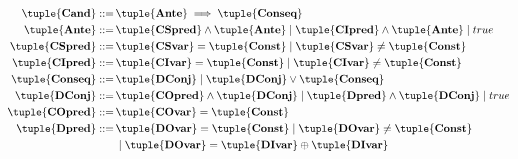 \begin{align}
\tuple{\textbf{Cand}} ::=\, & \tuple{\textbf{Ante}} \implies \tuple{\textbf{Conseq}} \\
\tuple{\textbf{Ante}} ::=\, & \tuple{\textbf{CSpred}} \land \tuple{\textbf{Ante}} \mid \tuple{\textbf{CIpred}} \land \tuple{\textbf{Ante}} \mid true\\
\tuple{\textbf{CSpred}} ::=\, & \tuple{\textbf{CSvar}} = \tuple{\textbf{Const}} \mid \tuple{\textbf{CSvar}} \neq \tuple{\textbf{Const}} \\
\tuple{\textbf{CIpred}} ::=\, & \tuple{\textbf{CIvar}} = \tuple{\textbf{Const}} \mid \tuple{\textbf{CIvar}} \neq \tuple{\textbf{Const}} \\
\tuple{\textbf{Conseq}} ::=\, & \tuple{\textbf{DConj}} \mid \tuple{\textbf{DConj}} \lor \tuple{\textbf{Conseq}} \\
\tuple{\textbf{DConj}} ::=\, & \tuple{\textbf{COpred}} \land \tuple{\textbf{DConj}} \mid \tuple{\textbf{Dpred}} \land \tuple{\textbf{DConj}} \mid true\\
\tuple{\textbf{COpred}} ::=\, & \tuple{\textbf{COvar}} = \tuple{\textbf{Const}} \\
\tuple{\textbf{Dpred}} ::=\, & \tuple{\textbf{DOvar}} = \tuple{\textbf{Const}} \mid \tuple{\textbf{DOvar}} \neq \tuple{\textbf{Const}} \\
& \mid \tuple{\textbf{DOvar}} = \tuple{\textbf{DIvar}} \oplus \tuple{\textbf{DIvar}} \notag
\end{align}